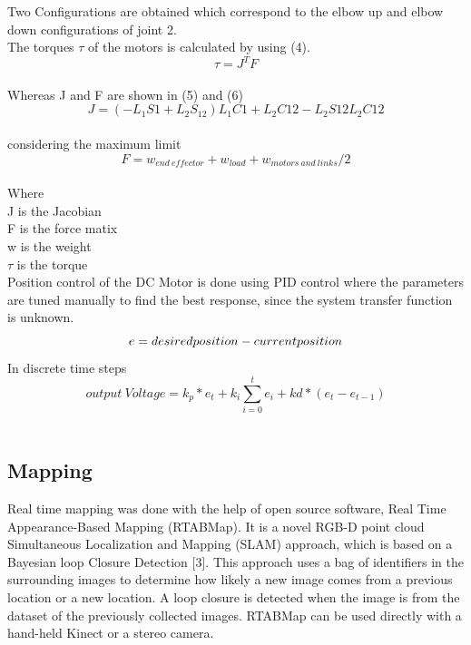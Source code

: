 \documentclass[conference]{IEEEtran}
\begin{document}
Two Configurations are obtained which correspond to the elbow up and elbow down configurations of joint 2.\\
The torques $\tau$ of the motors is calculated by using (4).\\
\begin{equation} \label{eq:4}
\tau=J^TF
\end{equation}\\
Whereas J and F are shown in (5) and (6)
\begin{equation} \label{eq:5}
J=(-L_1S1+L_2S_12)L_1C1+L_2C12-L_2S12L_2C12
\end{equation}\\
considering the maximum limit
\begin{equation} \label{eq:6}
F=w_{end\ effector}+w_{load}+w_{motors\ and\ links}/2
\end{equation}\\

Where\\
J is the Jacobian\\
F is the force matix\\
w is the weight \\
$\tau$ is the torque\\
Position control of the DC Motor is done using PID control where the parameters are tuned manually to find the best response, since the system transfer function is unknown.\\
\begin{equation} \label{eq:7}
e= desired position- current position\\
\end{equation}
In discrete time steps\\
\begin{equation} \label{eq:8}
output\ Voltage=k_p*e_t+k_i\sum_{i=0}^{t}e_i+kd*(e_t-e_{t-1})
\end{equation}\\
\subsection{Mapping}
Real time mapping was done with the help of open source software, Real Time Appearance-Based Mapping (RTABMap). It is a novel RGB-D point cloud Simultaneous Localization and Mapping (SLAM) approach, which is based on a Bayesian loop Closure Detection [3]. This approach uses a bag of identifiers in the surrounding images to determine how likely a new image comes from a previous location or a new location. A loop closure is detected when the image is from the dataset of the previously collected images. RTABMap can be used directly with a hand-held Kinect or a stereo camera.
\end{document}
